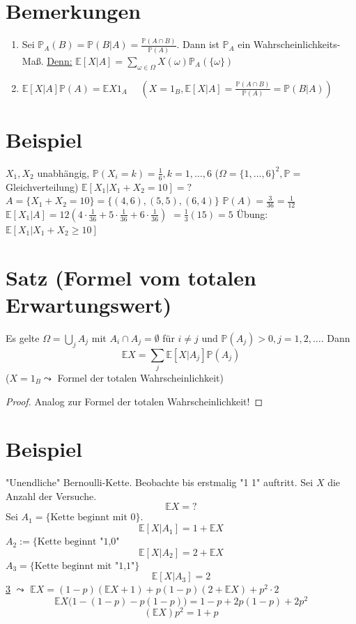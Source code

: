 \documentclass[a4paper,11pt,notitlepage]{report}
\newcommand{\Prim}{{\ensuremath{\mathbb{P}}}}
\newcommand{\E}{{\ensuremath{\mathbb{E}}}}
\begin{document}
\section{Bemerkungen}
\label{13.2}
\begin{enumerate}
	\item Sei $\Prim_A(B) = \Prim(B | A) = \frac{\Prim(A \cap B)}{\Prim(A)}.$
	Dann ist $\Prim_A$ ein Wahrscheinlichkeits-Maß.
	\newline
	\underline{Denn:} $\E [X|A] = \sum\limits_{\omega \in \Omega}{X(\omega) \Prim_A(\{\omega\})}$
	\item $\E [X | A] \Prim(A) = \E X 1_A$
	$\quad \left(X=1_B, \E [X|A] = \frac{\Prim(A \cap B)}{\Prim(A)} = \Prim(B|A)\right)$
\end{enumerate}

\section{Beispiel}
$X_1, X_2$ unabhängig, $\Prim(X_i = k) = \frac{1}{6}, k = 1, \ldots, 6$ ($\Omega = \{1, \ldots, 6\}^2, \Prim= $ Gleichverteilung)
\newline
$\E [X_1 | X_1 + X_2 = 10] = ?$
\newline
$A = \{X_1 + X_2 = 10\} = \{(4,6),(5,5),(6,4)\}$
\newline
$\Prim(A) = \frac{3}{36} = \frac{1}{12}$
\newline
$\E [X_1 | A] = 12 (4 \cdot \frac{1}{36} + 5 \cdot \frac{1}{36} + 6 \cdot \frac{1}{36})$
\newline
$= \frac{1}{3} (15) = 5$
\newline
Übung: $\E [X_1 | X_1 + X_2 \geq 10]$

\section{Satz (Formel vom totalen Erwartungswert)} \label{13.4}
Es gelte $\Omega = \bigcup\limits_{j}{A_j}$ mit $A_i \cap A_j = \emptyset$
für $i \neq j$ und $\Prim(A_j) > 0, j = 1, 2, \ldots$. Dann
$$\E X = \sum\limits_{j}{\E [X | A_j] \Prim(A_j)}$$
($X=1_B \leadsto $ Formel der totalen Wahrscheinlichkeit)

\begin{proof}
	Analog zur Formel der totalen Wahrscheinlichkeit!
\end{proof}

\section{Beispiel}
"Unendliche" Bernoulli-Kette. \newline
Beobachte bis erstmalig "1 1" auftritt. Sei $X$ die Anzahl der Versuche.
$$\E X = ?$$
Sei $A_1 = \{\text{Kette beginnt mit $0$}\}$.
$$\E [X|A_1] = 1 + \E X$$
$A_2 := \{\text{Kette beginnt "1,0"}$
$$\E [X|A_2] = 2 + \E X$$
$A_3 = \{\text{Kette beginnt mit "1,1"}\}$
$$\E [X | A_3] = 2$$
\ref{13.4} $\leadsto$ $\E X = (1-p) (\E X + 1) + p (1-p) (2 + \E X) + p^2 \cdot 2$
$$\E X \big(1 - (1-p) - p (1-p)\big) = 1-p + 2 p (1-p) + 2 p^2$$
$$(\E X) p^2 = 1+p $$
\end{document}
